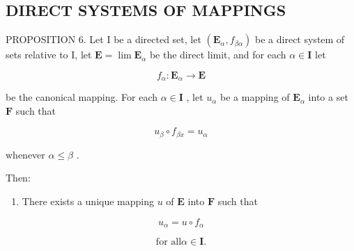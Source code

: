 \subsection{DIRECT SYSTEMS OF MAPPINGS}

PROPOSITION 6. Let I be a directed set, let \((\mathbf{E}_{\alpha}, f_{\beta \alpha})\) be a direct system of sets relative to I, let \(\mathbf{E} = \lim \mathbf{E}_{\alpha}\) be the direct limit, and for each \(\alpha \in \mathbf{I}\) let

\[
f _ {\alpha}: \mathbf {E} _ {\alpha} \rightarrow \mathbf {E}
\]

be the canonical mapping. For each \(\alpha \in \mathbf{I}\) , let \(u_{\alpha}\) be a mapping of \(\mathbf{E}_{\alpha}\) into a set \(\mathbf{F}\) such that

\[
u _ {\beta} \circ f _ {\beta x} = u _ {\alpha}\tag{23}
\]

whenever \(\alpha \leqslant \beta\) .

Then:

\begin{enumerate}
\def\labelenumi{(\alph{enumi})}
\tightlist
\item
  There exists a unique mapping \(u\) of \(\mathbf{E}\) into \(\mathbf{F}\) such that
\end{enumerate}

\[
u _ {\alpha} = u \circ f _ {\alpha}\tag{24}
\]

\[
{\text{for all}} \alpha \in \mathbf {I}.
\]

